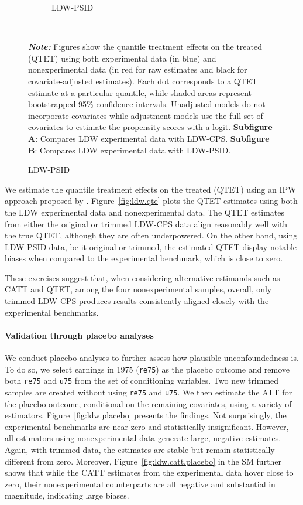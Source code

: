 \documentclass[letterpaper,12pt,leqno]{article}
\begin{document}
\begin{figure}[!ht]
\begin{minipage}[c]{1\textwidth}
\begin{subfigure}{1\linewidth}
            \caption{LDW-PSID}
        \end{subfigure}
    \end{minipage}%
    \\\raggedright
     {\footnotesize\textbf{\textit{Note:}} Figures show the quantile treatment effects on the treated (QTET) using both experimental data (in blue) and nonexperimental data (in red for raw estimates and black for covariate-adjusted estimates). Each dot corresponds to a QTET estimate at a particular quantile, while shaded areas represent bootstrapped 95\% confidence intervals. Unadjusted models do not incorporate covariates while adjustment models use the full set of covariates to estimate the propensity scores with a logit. \textbf{Subfigure A}: Compares LDW experimental data with LDW-CPS. \textbf{Subfigure B}: Compares LDW experimental data with LDW-PSID.}
\end{figure}

We estimate the quantile treatment effects on the treated (QTET) using an IPW approach proposed by \citet{firpo2007efficient}. Figure~\ref{fig:ldw.qte} plots the QTET estimates using both the LDW experimental data and nonexperimental data.  The QTET estimates from either the original or trimmed LDW-CPS data align reasonably well with the true QTET, although they are often underpowered. On the other hand, using LDW-PSID data, be it original or trimmed, the estimated QTET display notable biases when compared to the experimental benchmark, which is close to zero.

These exercises suggest that, when considering alternative estimands such as CATT and QTET, among the four nonexperimental samples, overall, only trimmed LDW-CPS produces results consistently aligned closely with the experimental benchmarks.



\paragraph{Validation through placebo analyses} We conduct placebo analyses to further assess how plausible unconfoundedness is. To do so, we select earnings in 1975 (\texttt{re75}) as the placebo outcome and remove both \texttt{re75} and \texttt{u75} from the set of conditioning variables. Two new trimmed samples are created without using \texttt{re75} and \texttt{u75}. We then estimate the ATT for the placebo outcome, conditional on the remaining covariates, using a variety of estimators. Figure~\ref{fig:ldw.placebo} presents the findings. Not surprisingly, the experimental benchmarks are near zero and statistically insignificant. However, all estimators using nonexperimental data generate large, negative estimates. Again, with trimmed data, the estimates are stable but remain statistically different from zero. Moreover, Figure~\ref{fig:ldw.catt.placebo} in the SM further shows that while the CATT estimates from the experimental data hover close to zero, their nonexperimental counterparts are all negative and substantial in magnitude, indicating large biases.
\end{document}
